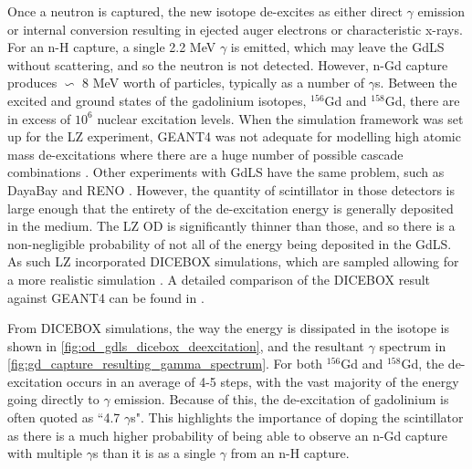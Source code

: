 \par
Once a neutron is captured, the new isotope de-excites as either direct $\gamma$ emission or internal conversion resulting in ejected auger electrons or characteristic x-rays.
For an n-H capture, a single 2.2 MeV $\gamma$ is emitted, which may leave the GdLS without scattering, and so the neutron is not detected.
However, n-Gd capture produces $\backsim$ 8 MeV worth of particles, typically as a number of $\gamma$s.
Between the excited and ground states of the gadolinium isotopes, ${}^{156}$Gd and ${}^{158}$Gd, there are in excess of $10^{6}$ nuclear excitation levels.
When the simulation framework was set up for the LZ experiment, GEANT4 was not adequate for modelling high atomic mass de-excitations where there are a huge number of possible cascade combinations \cite{ucsb_gdls_dicebox_simulations_ref}.
Other experiments with GdLS have the same problem, such as DayaBay \cite{dayabay_overview_ref} and RENO \cite{reno_overview_ref}.
However, the quantity of scintillator in those detectors is large enough that the entirety of the de-excitation energy is generally deposited in the medium.
The LZ OD is significantly thinner than those, and so there is a non-negligible probability of not all of the energy being deposited in the GdLS.
As such LZ incorporated DICEBOX \cite{dicebox_simulations_ref} simulations, which are sampled allowing for a more realistic simulation \cite{lz_simulations_ref}.
A detailed comparison of the DICEBOX result against GEANT4 can be found in \cite{ucsb_gdls_dicebox_simulations_ref}.
\par
From DICEBOX simulations, the way the energy is dissipated in the isotope is shown in \autoref{fig:od_gdls_dicebox_deexcitation}, and the resultant $\gamma$ spectrum in \autoref{fig:gd_capture_resulting_gamma_spectrum}.
For both ${}^{156}$Gd and ${}^{158}$Gd, the de-excitation occurs in an average of 4-5 steps, with the vast majority of the energy going directly to $\gamma$ emission.
Because of this, the de-excitation of gadolinium is often quoted as ``4.7 $\gamma$s".
This highlights the importance of doping the scintillator as there is a much higher probability of being able to observe an n-Gd capture with multiple $\gamma$s than it is as a single $\gamma$ from an n-H capture.



